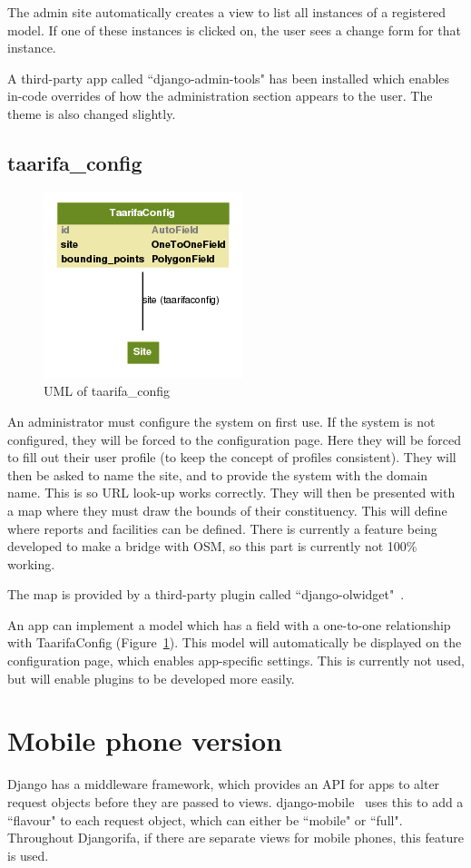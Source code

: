 The admin site automatically creates a view to list all instances of a registered model. If one of these instances is clicked on, the user sees a change form for that instance.

A third-party app called ``django-admin-tools" has been installed which enables in-code overrides of how the administration section appears to the user. The theme is also changed slightly.

\subsection{taarifa\_config}
\begin{figure}
\centering
\includegraphics[scale=0.51]{img/config.png}
\caption{UML of taarifa\_config}
\label{fig:taarifa_config}
\end{figure}
An administrator must configure the system on first use. If the system is not configured, they will be forced to the configuration page. Here they will be forced to fill out their user profile (to keep the concept of profiles consistent). They will then be asked to name the site, and to provide the system with the domain name. This is so URL look-up works correctly. They will then be presented with a map where they must draw the bounds of their constituency. This will define where reports and facilities can be defined. There is currently a feature being developed to make a bridge with \gls{OSM}, so this part is currently not 100\% working.

The map is provided by a third-party plugin called ``django-olwidget"~\cite{olwidget}.

An app can implement a model which has a field with a one-to-one relationship with TaarifaConfig (Figure~\ref{fig:taarifa_config}). This model will automatically be displayed on the configuration page, which enables app-specific settings. This is currently not used, but will enable plugins to be developed more easily.

\section{Mobile phone version}
\label{sec:di:mobile}

Django has a middleware framework, which provides an \gls{API} for apps to alter request objects before they are passed to views. django-mobile~\cite{mobile} uses this to add a ``flavour" to each request object, which can either be ``mobile" or ``full". Throughout Djangorifa, if there are separate views for mobile phones, this feature is used.